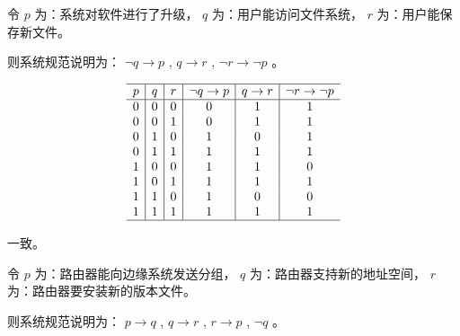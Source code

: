 {{        %
        \begin{practices}
            令 $p$ 为：系统对软件进行了升级， $q$ 为：用户能访问文件系统， $r$ 为：用户能保存新文件。

            则系统规范说明为： $\neg q \rightarrow p$ , $q \rightarrow r$ , $\neg r \rightarrow \neg p$ 。

            \begin{table}[H]
                \[
                    \begin{array}{c|c|c|c|c|c}
                        \hline
                        p & q & r & \neg q \rightarrow p & q \rightarrow r & \neg r \rightarrow \neg p \\
                        \hline
                        0 & 0 & 0 & 0 & 1 & 1 \\
                        0 & 0 & 1 & 0 & 1 & 1 \\
                        0 & 1 & 0 & 1 & 0 & 1 \\
                        0 & 1 & 1 & 1 & 1 & 1 \\
                        1 & 0 & 0 & 1 & 1 & 0 \\
                        1 & 0 & 1 & 1 & 1 & 1 \\
                        1 & 1 & 0 & 1 & 0 & 0 \\
                        1 & 1 & 1 & 1 & 1 & 1 \\
                        \hline
                    \end{array}
                \]
            \end{table}

            一致。
        \end{practices}

        \begin{practices}
            令 $p$ 为：路由器能向边缘系统发送分组， $q$ 为：路由器支持新的地址空间， $r$ 为：路由器要安装新的版本文件。

            则系统规范说明为： $p \rightarrow q$ , $q \rightarrow r$ , $r \rightarrow p$ , $\neg q$ 。


\end{practices}}}
